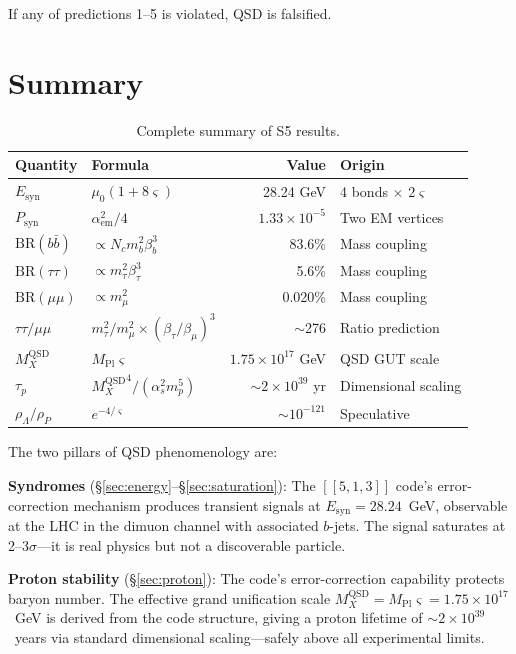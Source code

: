 \documentclass[11pt,a4paper]{article}
\theoremstyle{definition}
\theoremstyle{remark}
\newcommand{\strain}{\varsigma}
\newcommand{\murad}{\mu_0}
\newcommand{\Mpl}{M_{\mathrm{Pl}}}
\newcommand{\MX}{{M_X^{\mathrm{QSD}}}}
\newcommand{\Esyn}{E_{\mathrm{syn}}}
\newcommand{\Psyn}{P_{\mathrm{syn}}}
\newcommand{\aem}{\alpha_{\mathrm{em}}}
\begin{document}
If any of predictions 1--5 is violated, QSD is falsified.

\section{Summary}
\label{sec:summary}

\begin{table}[H]
\centering
\begin{tabular}{llrl}
\toprule
\textbf{Quantity} & \textbf{Formula} & \textbf{Value} & \textbf{Origin} \\
\midrule
$\Esyn$ & $\murad(1 + 8\strain)$ & 28.24 GeV & 4 bonds $\times$ $2\strain$ \\
$\Psyn$ & $\aem^2/4$ & $1.33 \times 10^{-5}$ & Two EM vertices \\
$\mathrm{BR}(b\bar{b})$ & $\propto N_c m_b^2 \beta_b^3$ & 83.6\% & Mass coupling \\
$\mathrm{BR}(\tau\tau)$ & $\propto m_\tau^2 \beta_\tau^3$ & 5.6\% & Mass coupling \\
$\mathrm{BR}(\mu\mu)$ & $\propto m_\mu^2$ & 0.020\% & Mass coupling \\
$\tau\tau/\mu\mu$ & $m_\tau^2/m_\mu^2 \times (\beta_\tau/\beta_\mu)^3$ & $\sim$276 & Ratio prediction \\
\midrule
$\MX$ & $\Mpl\strain$ & $1.75 \times 10^{17}$ GeV & QSD GUT scale \\
$\tau_p$ & $\MX^4/(\alpha_s^2 m_p^5)$ & $\sim 2 \times 10^{39}$ yr & Dimensional scaling \\
$\rho_\Lambda/\rho_P$ & $e^{-4/\strain}$ & $\sim 10^{-121}$ & Speculative \\
\bottomrule
\end{tabular}
\caption{Complete summary of S5 results.}
\label{tab:summary}
\end{table}

The two pillars of QSD phenomenology are:

\textbf{Syndromes} (\S\ref{sec:energy}--\S\ref{sec:saturation}): The $[[5,1,3]]$ code's error-correction mechanism produces transient signals at $\Esyn = 28.24$~GeV, observable at the LHC in the dimuon channel with associated $b$-jets. The signal saturates at 2--3$\sigma$---it is real physics but not a discoverable particle.

\textbf{Proton stability} (\S\ref{sec:proton}): The code's error-correction capability protects baryon number. The effective grand unification scale $\MX = \Mpl\strain = 1.75 \times 10^{17}$~GeV is derived from the code structure, giving a proton lifetime of $\sim 2 \times 10^{39}$~years via standard dimensional scaling---safely above all experimental limits.
\end{document}
